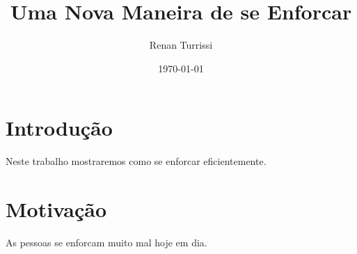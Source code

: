 \documentclass{article}
\author{Renan Turrissi}
\date{\today}
\title{Uma Nova Maneira de se Enforcar}
\begin{document}
\maketitle

\newpage

\section{Introdução}
Neste trabalho mostraremos como se enforcar eficientemente.

\section{Motivação}
As pessoas se enforcam muito mal hoje em dia.
\end{document}
